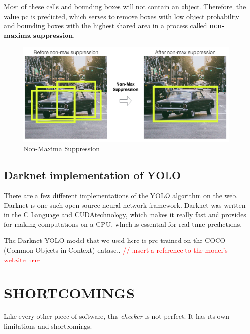 \documentclass[a4paper]{article}
\begin{document}
Most of these cells and bounding boxes will not contain an object. Therefore, the value pc is predicted, which serves to remove boxes with low object probability and bounding boxes with the highest shared area in a process called \textbf{non-maxima suppression}.

\begin{figure}[h!]
    \centering
    \includegraphics[width=\linewidth]{Pictures/yoloWorks3.png}
    \caption{Non-Maxima Suppression}
    \label{fig:NMS}
\end{figure}
\pagebreak
\subsection{Darknet implementation of YOLO}
There are a few different implementations of the YOLO algorithm on the web. Darknet is one such open source neural network framework. Darknet was written in the C Language and CUDAtechnology, which makes it really fast and provides for making computations on a GPU, which is essential for real-time predictions.

The Darknet YOLO model that we used here is pre-trained on the COCO (Common Objects in Context) dataset. \textcolor{red}{// insert a reference to the model's website here}
\newpage

\section{SHORTCOMINGS}

Like every other piece of software, this \textit{checker} is not perfect. It has its own limitations and shortcomings.
\end{document}
